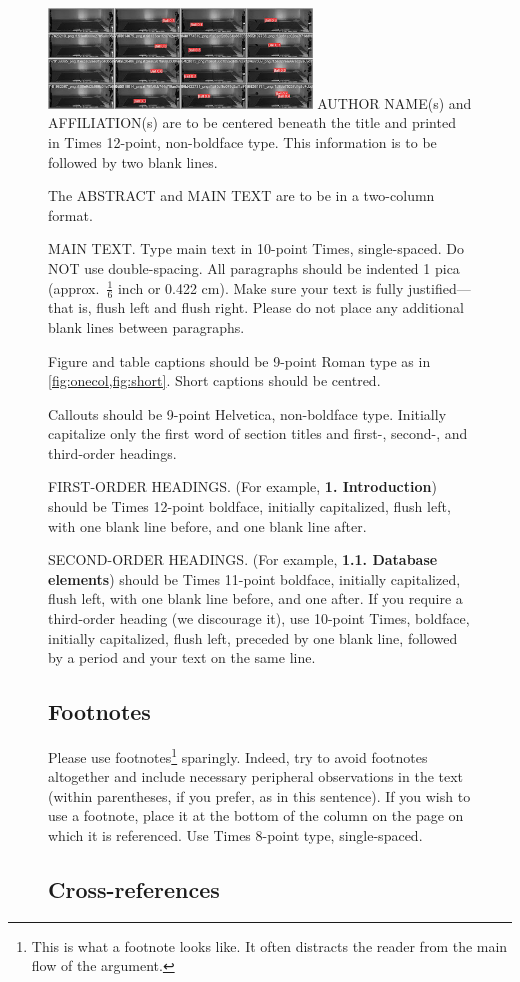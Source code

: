 \documentclass[10pt,twocolumn,letterpaper]{article}
\begin{document}
\begin{figure}{
  \includegraphics[width=7cm]{validation.jpeg}
}
AUTHOR NAME(s) and AFFILIATION(s) are to be centered beneath the title
and printed in Times 12-point, non-boldface type.
This information is to be followed by two blank lines.

The ABSTRACT and MAIN TEXT are to be in a two-column format.

MAIN TEXT.
Type main text in 10-point Times, single-spaced.
Do NOT use double-spacing.
All paragraphs should be indented 1 pica (approx.~$\frac{1}{6}$ inch or 0.422 cm).
Make sure your text is fully justified---that is, flush left and flush right.
Please do not place any additional blank lines between paragraphs.

Figure and table captions should be 9-point Roman type as in \cref{fig:onecol,fig:short}.
Short captions should be centred.

\noindent Callouts should be 9-point Helvetica, non-boldface type.
Initially capitalize only the first word of section titles and first-, second-, and third-order headings.

FIRST-ORDER HEADINGS.
(For example, {\large \bf 1. Introduction}) should be Times 12-point boldface, initially capitalized, flush left, with one blank line before, and one blank line after.

SECOND-ORDER HEADINGS.
(For example, { \bf 1.1. Database elements}) should be Times 11-point boldface, initially capitalized, flush left, with one blank line before, and one after.
If you require a third-order heading (we discourage it), use 10-point Times, boldface, initially capitalized, flush left, preceded by one blank line, followed by a period and your text on the same line.

\subsection{Footnotes}

Please use footnotes\footnote{This is what a footnote looks like.
It often distracts the reader from the main flow of the argument.} sparingly.
Indeed, try to avoid footnotes altogether and include necessary peripheral observations in the text (within parentheses, if you prefer, as in this sentence).
If you wish to use a footnote, place it at the bottom of the column on the page on which it is referenced.
Use Times 8-point type, single-spaced.


\subsection{Cross-references}


\end{figure}
\end{document}
